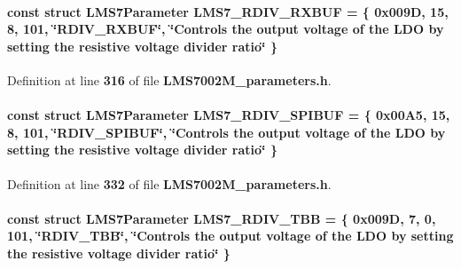 \paragraph[{L\+M\+S7\+\_\+\+R\+D\+I\+V\+\_\+\+R\+X\+B\+UF}]{\setlength{\rightskip}{0pt plus 5cm}const struct {\bf L\+M\+S7\+Parameter} L\+M\+S7\+\_\+\+R\+D\+I\+V\+\_\+\+R\+X\+B\+UF = \{ 0x009\+D, 15, 8, 101, \char`\"{}\+R\+D\+I\+V\+\_\+\+R\+X\+B\+U\+F\char`\"{}, \char`\"{}\+Controls the output voltage of the L\+D\+O by setting the resistive voltage divider ratio\char`\"{} \}\hspace{0.3cm}{\ttfamily [static]}}\label{LMS7002M__parameters_8h_a785d7768c411d21af06b0dd9ef3572a6}


Definition at line {\bf 316} of file {\bf L\+M\+S7002\+M\+\_\+parameters.\+h}.

\paragraph[{L\+M\+S7\+\_\+\+R\+D\+I\+V\+\_\+\+S\+P\+I\+B\+UF}]{\setlength{\rightskip}{0pt plus 5cm}const struct {\bf L\+M\+S7\+Parameter} L\+M\+S7\+\_\+\+R\+D\+I\+V\+\_\+\+S\+P\+I\+B\+UF = \{ 0x00\+A5, 15, 8, 101, \char`\"{}\+R\+D\+I\+V\+\_\+\+S\+P\+I\+B\+U\+F\char`\"{}, \char`\"{}\+Controls the output voltage of the L\+D\+O by setting the resistive voltage divider ratio\char`\"{} \}\hspace{0.3cm}{\ttfamily [static]}}\label{LMS7002M__parameters_8h_a2830a6c31bc159e49f73596a84531d07}


Definition at line {\bf 332} of file {\bf L\+M\+S7002\+M\+\_\+parameters.\+h}.

\paragraph[{L\+M\+S7\+\_\+\+R\+D\+I\+V\+\_\+\+T\+BB}]{\setlength{\rightskip}{0pt plus 5cm}const struct {\bf L\+M\+S7\+Parameter} L\+M\+S7\+\_\+\+R\+D\+I\+V\+\_\+\+T\+BB = \{ 0x009\+D, 7, 0, 101, \char`\"{}\+R\+D\+I\+V\+\_\+\+T\+B\+B\char`\"{}, \char`\"{}\+Controls the output voltage of the L\+D\+O by setting the resistive voltage divider ratio\char`\"{} \}\hspace{0.3cm}{\ttfamily [static]}}\label{LMS7002M__parameters_8h_ad25d13ed5e8ae20f3adc09f66519dbac}


